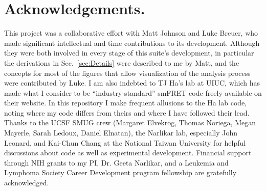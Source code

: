 \documentclass[11pt]{article}
\begin{document}
%
%
%

\newpage

\section{Acknowledgements.}

This project was a collaborative effort with Matt Johnson and Luke Breuer, who made significant intellectual and time contributions to its development.  Although they were both involved in every stage of this suite's development, in particular the derivations in Sec.~\ref{sec:Details} were described to me by Matt, and the concepts for most of the figures that allow visualization of the analysis process were contributed by Luke.  I am also indebted to TJ Ha's lab at UIUC, which has made what I consider to be ``industry-standard'' smFRET code freely available on their website. In this repository I make frequent allusions to the Ha lab code, noting where my code differs from theirs and where I have followed their lead. Thanks to the UCSF SMUG crew (Margaret Elvekrog, Thomas Noriega, Megan Mayerle, Sarah Ledoux, Daniel Elnatan), the Narlikar lab, especially John Leonard, and Kai-Chun Chang at the National Taiwan University for helpful discussions about code as well as experimental development. %
Financial support through NIH grants to my PI, Dr. Geeta Narlikar, and a Leukemia and Lymphoma Society Career Development program fellowship are gratefully acknowledged.


\end{document}
